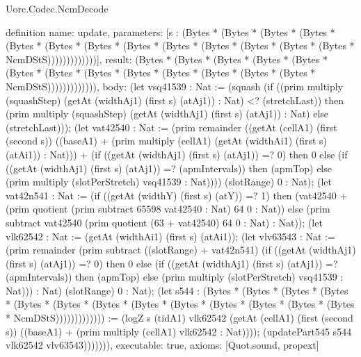 \begin{lexlean}{Uorc.Codec.NcmDecode}
\begin{semanticmodule}
definition{
  name: update,
  parameters: [s : (Bytes * (Bytes * (Bytes * (Bytes * (Bytes * (Bytes * (Bytes * (Bytes * (Bytes * (Bytes * (Bytes * (Bytes * (Bytes * NcmDStS)))))))))))))],
  result: (Bytes * (Bytes * (Bytes * (Bytes * (Bytes * (Bytes * (Bytes * (Bytes * (Bytes * (Bytes * (Bytes * (Bytes * (Bytes * NcmDStS))))))))))))),
  body: (let vsq41539 : Nat := (squash (if ((prim multiply (squashStep) (getAt (widthAj1) (first s) (atAj1)) : Nat) <? (stretchLast)) then (prim multiply (squashStep) (getAt (widthAj1) (first s) (atAj1)) : Nat) else (stretchLast))); (let vat42540 : Nat := (prim remainder ((getAt (cellA1) (first (second s)) ((baseA1) + (prim multiply (cellA1) (getAt (widthAi1) (first s) (atAi1)) : Nat))) + (if ((getAt (widthAj1) (first s) (atAj1)) =? 0) then 0 else (if ((getAt (widthAj1) (first s) (atAj1)) =? (apmIntervals)) then (apmTop) else (prim multiply (slotPerStretch) vsq41539 : Nat)))) (slotRange) 0 : Nat); (let vat42n541 : Nat := (if ((getAt (widthY) (first s) (atY)) =? 1) then (vat42540 + (prim quotient (prim subtract 65598 vat42540 : Nat) 64 0 : Nat)) else (prim subtract vat42540 (prim quotient (63 + vat42540) 64 0 : Nat) : Nat)); (let vlk62542 : Nat := (getAt (widthAi1) (first s) (atAi1)); (let vlv63543 : Nat := (prim remainder (prim subtract ((slotRange) + vat42n541) (if ((getAt (widthAj1) (first s) (atAj1)) =? 0) then 0 else (if ((getAt (widthAj1) (first s) (atAj1)) =? (apmIntervals)) then (apmTop) else (prim multiply (slotPerStretch) vsq41539 : Nat))) : Nat) (slotRange) 0 : Nat); (let s544 : (Bytes * (Bytes * (Bytes * (Bytes * (Bytes * (Bytes * (Bytes * (Bytes * (Bytes * (Bytes * (Bytes * (Bytes * (Bytes * NcmDStS))))))))))))) := (logZ s (tidA1) vlk62542 (getAt (cellA1) (first (second s)) ((baseA1) + (prim multiply (cellA1) vlk62542 : Nat)))); (updatePart545 s544 vlk62542 vlv63543))))))),
  executable: true,
  axioms: [Quot.sound, propext]
}


\end{semanticmodule}
\end{lexlean}
